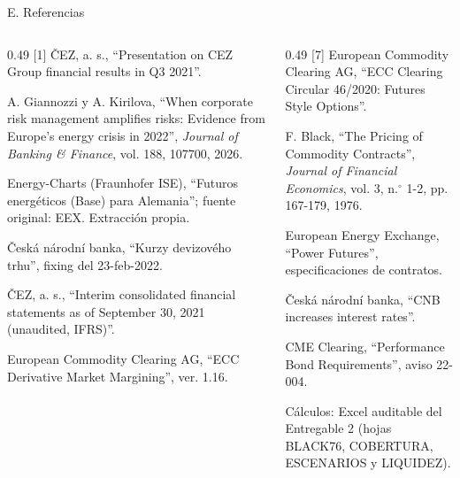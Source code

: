 \documentclass[aspectratio=169,11pt]{beamer}
\newcommand{\comillas}[1]{``#1''}
\begin{document}
\begin{frame}[t]{E. Referencias}
  \tiny
  \setlength{\parskip}{0.6mm}
  \begin{columns}[T]
    \begin{column}{0.49\textwidth}
      [1] \v{C}EZ, a. s., \comillas{Presentation on CEZ Group financial results in Q3 2021}.\par
      [2] A. Giannozzi y A. Kirilova, \comillas{When corporate risk management amplifies risks: Evidence from Europe's energy crisis in 2022}, \emph{Journal of Banking \& Finance}, vol. 188, 107700, 2026.\par
      [3] Energy-Charts (Fraunhofer ISE), \comillas{Futuros energéticos (Base) para Alemania}; fuente original: EEX. Extracción propia.\par
      [4] \v{C}esk\'a n\'arodn\'i banka, \comillas{Kurzy devizového trhu}, fixing del 23-feb-2022.\par
      [5] \v{C}EZ, a. s., \comillas{Interim consolidated financial statements as of September 30, 2021 (unaudited, IFRS)}.\par
      [6] European Commodity Clearing AG, \comillas{ECC Derivative Market Margining}, ver. 1.16.\par
    \end{column}
    \begin{column}{0.49\textwidth}
      [7] European Commodity Clearing AG, \comillas{ECC Clearing Circular 46/2020: Futures Style Options}.\par
      [8] F. Black, \comillas{The Pricing of Commodity Contracts}, \emph{Journal of Financial Economics}, vol. 3, n.$^\circ$ 1-2, pp. 167-179, 1976.\par
      [9] European Energy Exchange, \comillas{Power Futures}, especificaciones de contratos.\par
      [10] \v{C}esk\'a n\'arodn\'i banka, \comillas{CNB increases interest rates}.\par
      [11] CME Clearing, \comillas{Performance Bond Requirements}, aviso 22-004.\par
      Cálculos: Excel auditable del Entregable 2 (hojas BLACK76, COBERTURA, ESCENARIOS y LIQUIDEZ).
    \end{column}
  \end{columns}
\end{frame}
\end{document}

